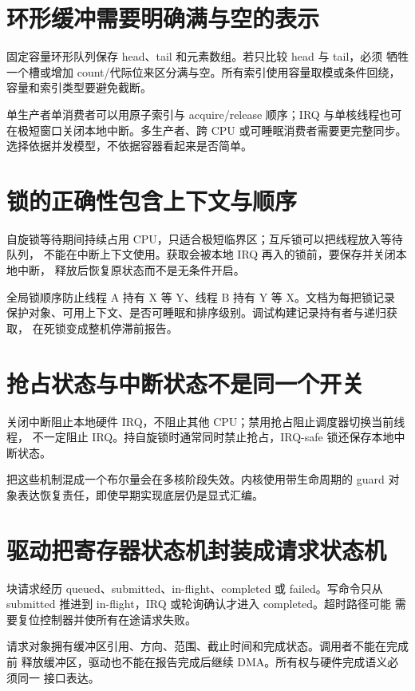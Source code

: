 \section{环形缓冲需要明确满与空的表示}

固定容量环形队列保存 head、tail 和元素数组。若只比较 head 与 tail，必须
牺牲一个槽或增加 count/代际位来区分满与空。所有索引使用容量取模或条件回绕，
容量和索引类型要避免截断。

单生产者单消费者可以用原子索引与 acquire/release 顺序；IRQ 与单核线程也可
在极短窗口关闭本地中断。多生产者、跨 CPU 或可睡眠消费者需要更完整同步。
选择依据并发模型，不依据容器看起来是否简单。

\section{锁的正确性包含上下文与顺序}

自旋锁等待期间持续占用 CPU，只适合极短临界区；互斥锁可以把线程放入等待队列，
不能在中断上下文使用。获取会被本地 IRQ 再入的锁前，要保存并关闭本地中断，
释放后恢复原状态而不是无条件开启。

全局锁顺序防止线程 A 持有 X 等 Y、线程 B 持有 Y 等 X。文档为每把锁记录
保护对象、可用上下文、是否可睡眠和排序级别。调试构建记录持有者与递归获取，
在死锁变成整机停滞前报告。

\section{抢占状态与中断状态不是同一个开关}

关闭中断阻止本地硬件 IRQ，不阻止其他 CPU；禁用抢占阻止调度器切换当前线程，
不一定阻止 IRQ。持自旋锁时通常同时禁止抢占，IRQ-safe 锁还保存本地中断状态。

把这些机制混成一个布尔量会在多核阶段失效。内核使用带生命周期的 guard
对象表达恢复责任，即使早期实现底层仍是显式汇编。

\section{驱动把寄存器状态机封装成请求状态机}

块请求经历 queued、submitted、in-flight、completed 或 failed。写命令只从
submitted 推进到 in-flight，IRQ 或轮询确认才进入 completed。超时路径可能
需要复位控制器并使所有在途请求失败。

请求对象拥有缓冲区引用、方向、范围、截止时间和完成状态。调用者不能在完成前
释放缓冲区，驱动也不能在报告完成后继续 DMA。所有权与硬件完成语义必须同一
接口表达。

